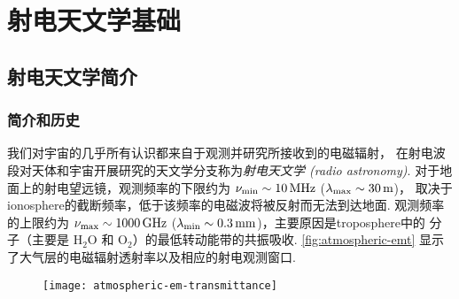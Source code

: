 
\chapter{射电天文学基础}
\label{chap:radio-astronomy}

\section{射电天文学简介}
\label{sec:radio-astro-intro}

\subsection{简介和历史}

我们对宇宙的几乎所有认识都来自于观测并研究所接收到的电磁辐射，
在射电波段对天体和宇宙开展研究的天文学分支称为\emph{射电天文学 (radio astronomy)}.
对于地面上的射电望远镜，观测频率的下限约为 $\nu_{\R{min}} \sim \SI{10}{\MHz}$
($\lambda_{\mathrm{max}} \sim \SI{30}{\meter}$)，
取决于\ac{ionosphere}的截断频率，低于该频率的电磁波将被反射而无法到达地面.
观测频率的上限约为 $\nu_{\R{max}} \sim \SI{1000}{\GHz}$
($\lambda_{\R{min}} \sim \SI{0.3}{\mm}$)，主要原因是\ac{troposphere}中的
分子（主要是 $\mathrm{H_2 O}$ 和 $\mathrm{O_2}$）的最低转动能带的共振吸收.
\autoref{fig:atmospheric-emt} 显示了大气层的电磁辐射透射率以及相应的射电观测窗口.

\begin{figure}[htp]
  \centering
  \texttt{[image: atmospheric-em-transmittance]}
  \label{fig:atmospheric-emt}
\end{figure}

